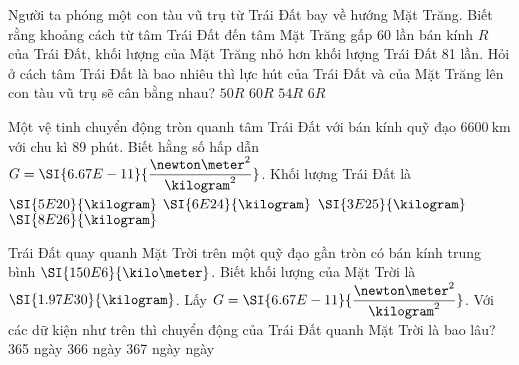 \begin{ex}
	Người ta phóng một con tàu vũ trụ từ Trái Đất bay về hướng Mặt Trăng. Biết rằng khoảng cách từ tâm Trái Đất đến tâm Mặt Trăng gấp 60 lần bán kính $R$ của Trái Đất, khối lượng của Mặt Trăng nhỏ hơn khối lượng Trái Đất 81 lần. Hỏi ở cách tâm Trái Đất là bao nhiêu thì lực hút của Trái Đất và của Mặt Trăng lên con tàu vũ trụ sẽ cân bằng nhau?
	\choice
	{$50R$}
	{$60R$}
	{\True $54R$}
	{$6R$}
\end{ex}
\begin{ex}
	Một vệ tinh chuyển động tròn quanh tâm Trái Đất với bán kính quỹ đạo $\SI{6600}{\kilo\meter}$ với chu kì 89 phút. Biết hằng số hấp dẫn $G=\SI{6.67E-11}{\dfrac{\newton\meter^2}{\kilogram^2}}$. Khối lượng Trái Đất là
	\choice
	{$\SI{5E20}{\kilogram}$}
	{\True $\SI{6E24}{\kilogram}$}
	{$\SI{3E25}{\kilogram}$}
	{$\SI{8E26}{\kilogram}$}
\end{ex}
\begin{ex}
	Trái Đất quay quanh Mặt Trời trên một quỹ đạo gần tròn có bán kính trung bình $\SI{150E6}{\kilo\meter}$. Biết khối lượng của Mặt Trời là $\SI{1.97E30}{\kilogram}$. Lấy $G=\SI{6.67E-11}{\dfrac{\newton\meter^2}{\kilogram^2}}$. Với các dữ kiện như trên thì chuyển động của Trái Đất quanh Mặt Trời là bao lâu?
	\choice
	{365 ngày}
	{366 ngày}
	{367 ngày}
	{ ngày}
\end{ex}
